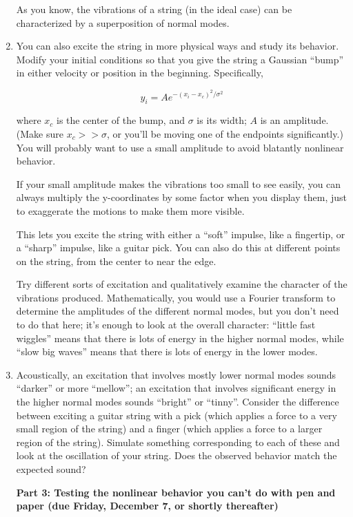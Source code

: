 \documentclass[12pt]{article}
\begin{document}
\begin{enumerate}
As you know, the vibrations of a string (in the ideal case) can be characterized by a superposition of normal modes.

\item{You can also excite the string in more physical ways and study its behavior. Modify your initial conditions so that you give the string a Gaussian ``bump'' in either velocity or position in the beginning. Specifically,

   $$
    y_i = A e^{-(x_i-x_c)^2/\sigma^2}
    $$

   where $x_c$ is the center of the bump, and $\sigma$ is its width; $A$ is an amplitude. (Make sure $x_c >> \sigma$, or you'll be moving one of the endpoints significantly.) You will probably want to use a small amplitude to avoid blatantly nonlinear behavior.

   If your small amplitude makes the vibrations too small to see easily, you can always multiply the y-coordinates by some factor when you display them,
   just to exaggerate the motions to make them more visible.

    This lets you excite the string with either a ``soft'' impulse, like a fingertip, or a ``sharp'' impulse, like a guitar pick. You can also do this at different points on the string, from the center to near the edge.

    Try different sorts of excitation and qualitatively examine the character of the vibrations produced. Mathematically, you would use a Fourier transform to determine the amplitudes of the different normal modes, but you don't 
    need to do that here; it's enough to look at the overall character: ``little fast wiggles'' means that there is lots of energy in the higher normal modes, while ``slow big waves'' means that there is lots of energy in the lower modes.
  }

\item{Acoustically, an excitation that involves mostly lower normal modes sounds ``darker'' or more ``mellow''; an excitation
that involves significant energy in the higher normal modes sounds ``bright'' or ``tinny''. Consider the difference between
exciting a guitar string with a pick (which applies a force to a very small region of the string) and a finger (which
applies a force to a larger region of the string). Simulate something corresponding to each of these and look at the 
oscillation of your string. Does the observed behavior match the expected sound?}

{\bf Part 3: Testing the nonlinear behavior you can't do with pen and paper (due Friday, December 7, or shortly thereafter)}


\end{enumerate}
\end{document}
